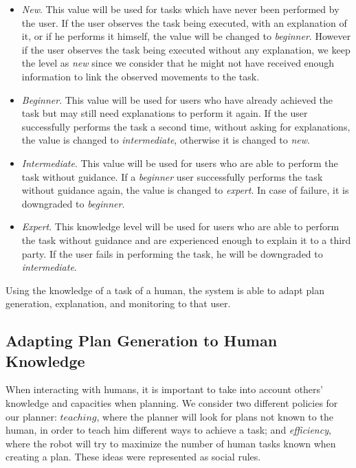 \begin{itemize}
\item \textit{New}. This value will be used for tasks which have never been performed by the user. If the user observes the task being executed, with an explanation of it, or if he performs it himself, the value will be changed to \textit{beginner}. However if the user observes the task being executed without any explanation, we keep the level as \textit{new} since we consider that he might not have received enough information to link the observed movements to the task.
\item \textit{Beginner}. This value will be used for users who have already achieved the task but may still need explanations to perform it again. If the user successfully performs the task a second time, without asking for explanations, the value is changed to \textit{intermediate}, otherwise it is changed to \textit{new}.
\item \textit{Intermediate}. This value will be used for users who are able to perform the task without guidance. If a \textit{beginner} user successfully performs the task without guidance again, the value is changed to \textit{expert}. In case of failure, it is downgraded to \textit{beginner}.
\item \textit{Expert}. This knowledge level will be used for users who are able to perform the task without guidance and are experienced enough to explain it to a third party. If the user fails in performing the task, he will be downgraded to \textit{intermediate}.
\end{itemize}

Using the knowledge of a task of a human, the system is able to adapt plan generation, explanation, and monitoring to that user.



\subsection{Adapting Plan Generation to Human Knowledge}
\label{subsec:plan_generation-adapting_knowledge}
When interacting with humans, it is important to take into account others' knowledge and capacities when planning. We consider two different policies for our planner: $teaching$, where the planner will look for plans not known to the human, in order to teach him different ways to achieve a task; and \textit{efficiency}, where the robot will try to maximize the number of human tasks known when creating a plan. These ideas were represented as social rules.

